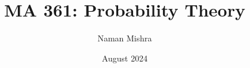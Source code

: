 \documentclass[12pt]{report}
\title{MA 361: Probability Theory}
\author{Naman Mishra}
\date{August 2024}
\begin{document}
\maketitle
\tableofcontents
\listoflecture
\listoftutorial
    
    
    
    
\end{document}
